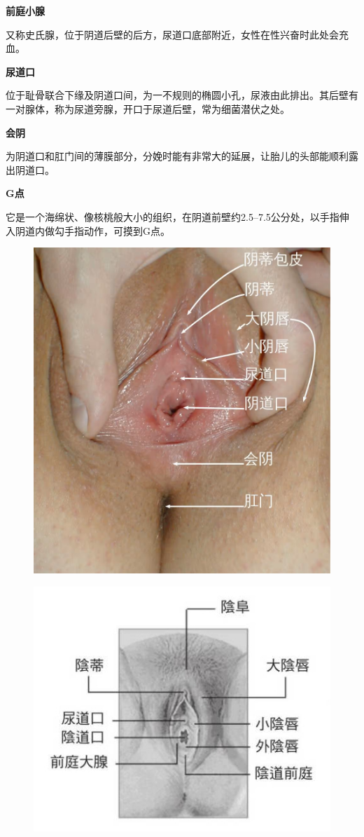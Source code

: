 \documentclass[12pt,UTF8]{ctexbook}
\begin{document}
\textbf{前庭小腺}

又称史氏腺，位于阴道后壁的后方，尿道口底部附近，女性在性兴奋时此处会充血。

\textbf{尿道口}

位于耻骨联合下缘及阴道口间，为一不规则的椭圆小孔，尿液由此排出。其后壁有一对腺体，称为尿道旁腺，开口于尿道后壁，常为细菌潜伏之处。

\textbf{会阴}

为阴道口和肛门间的薄膜部分，分娩时能有非常大的延展，让胎儿的头部能顺利露出阴道口。

\textbf{G点}

它是一个海绵状、像核桃般大小的组织，在阴道前壁约2.5--7.5公分处，以手指伸入阴道内做勾手指动作，可摸到G点。

\begin{figure}[H]
	\centering
	\includegraphics[width=0.7\linewidth]{1}
	\caption{}
	\label{fig:1}
\end{figure}

\begin{figure}[H]
	\centering
	\includegraphics[width=0.7\linewidth]{2}
	\caption{}
	\label{fig:1}
\end{figure}
\end{document}
